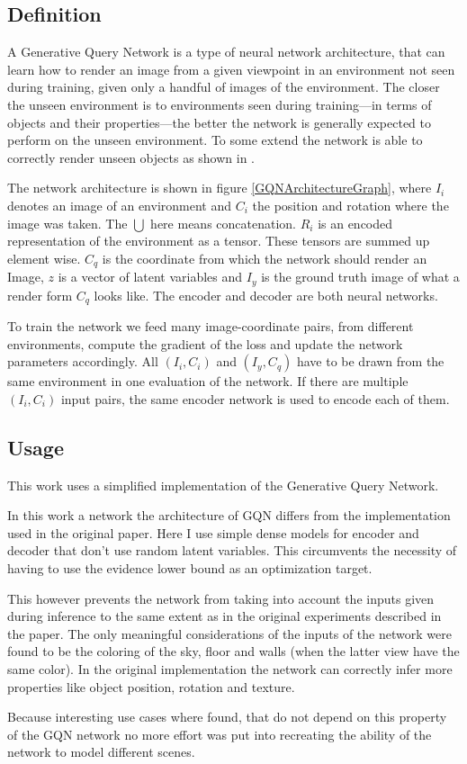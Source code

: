 \subsection{Definition}
A Generative Query Network \cite{gqn} is a type of neural network architecture, that can learn how to render an image from a given viewpoint in an environment not seen during training, given only a handful of images of the environment. The closer the unseen environment is to environments seen during training---in terms of objects and their properties---the better the network is generally expected to perform on the unseen environment. To some extend the network is able to correctly render unseen objects as shown in \cite{gqn}.

The network architecture is shown in figure \ref{GQNArchitectureGraph}, where $I_i$ denotes an image of an environment and $C_i$ the position and rotation where the image was taken. The $\bigcup$ here means concatenation. $R_i$ is an encoded representation of the environment as a tensor. These tensors are summed up element wise. $C_q$ is the coordinate from which the network should render an Image, $z$ is a vector of latent variables and $I_y$ is the ground truth image of what a render form $C_q$ looks like. The encoder and decoder are both neural networks.

To train the network we feed many image-coordinate pairs, from different environments, compute the gradient of the loss and update the network parameters accordingly. All $(I_i, C_i)$ and $(I_y, C_q)$ have to be drawn from the same environment in one evaluation of the network. If there are multiple $(I_i, C_i)$ input pairs, the same encoder network is used to encode each of them.

\GQNArchitectureGraph


\subsection{Usage}
This work uses a simplified implementation of the Generative Query Network.

In this work a network the architecture of GQN differs from the implementation used in the original paper. Here I use simple dense models for encoder and decoder that don't use random latent variables. This circumvents the necessity of having to use the evidence lower bound as an optimization target.

This however prevents the network from taking into account the inputs given during inference to the same extent as in the original experiments described in the paper. The only meaningful considerations of the inputs of the network were found to be the coloring of the sky, floor and walls (when the latter view have the same color). In the original implementation the network can correctly infer more properties like object position, rotation and texture.

Because interesting use cases where found, that do not depend on this property of the GQN network no more effort was put into recreating the ability of the network to model different scenes.

